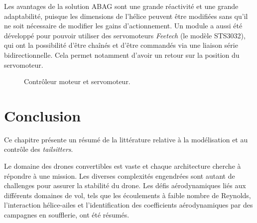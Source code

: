 Les avantages de la solution ABAG sont une grande réactivité et une grande adaptabilité, puisque les dimensions de l'hélice peuvent être modifiées sans qu'il ne soit nécessaire de modifier les gains d'actionnement.
Un module a aussi été développé pour pouvoir utiliser des servomoteurs \textit{Feetech} (le modèle STS3032), qui ont la possibilité d'être chaînés et d'être commandés via une liaison série bidirectionnelle. Cela permet notamment d'avoir un retour sur la position du servomoteur.

\begin{figure}[ht!]
    \centering
    \caption{Contrôleur moteur et servomoteur.}
    \label{fig:ESCServo}
\end{figure}




\section{Conclusion}

Ce chapitre présente un résumé de la littérature relative à la modélisation et au contrôle des \textit{tailsitters}.

Le domaine des drones convertibles est vaste et chaque architecture cherche à répondre à une mission. Les diverses complexités engendrées sont autant de challenges pour assurer la stabilité du drone. Les défis aérodynamiques liés aux différents domaines de vol, tels que les écoulements à faible nombre de Reynolds, l'interaction hélice-ailes et l'identification des coefficients aérodynamiques par des campagnes en soufflerie, ont été résumés. 

